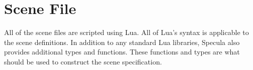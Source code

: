 \documentclass[../pbr.tex]{subfile}
\begin{document}
\section{Scene File}%
\label{sec:scene_file}

All of the scene files are scripted using Lua. All of Lua's syntax is
applicable to the scene definitions. In addition to any standard Lua libraries,
Specula also provides additional types and functions. These functions and types
are what should be used to construct the scene specification.
\end{document}
